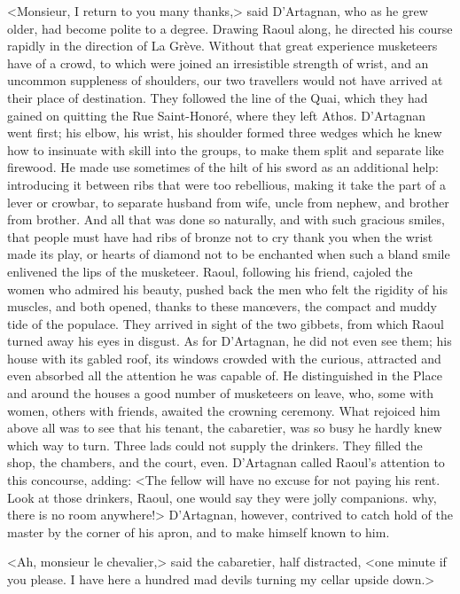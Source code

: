 <Monsieur, I return to you many thanks,> said D'Artagnan, who as he grew older, had become polite to a degree. Drawing Raoul along, he directed his course rapidly in the direction of La Grève. Without that great experience musketeers have of a crowd, to which were joined an irresistible strength of wrist, and an uncommon suppleness of shoulders, our two travellers would not have arrived at their place of destination. They followed the line of the Quai, which they had gained on quitting the Rue Saint-Honoré, where they left Athos. D'Artagnan went first; his elbow, his wrist, his shoulder formed three wedges which he knew how to insinuate with skill into the groups, to make them split and separate like firewood. He made use sometimes of the hilt of his sword as an additional help: introducing it between ribs that were too rebellious, making it take the part of a lever or crowbar, to separate husband from wife, uncle from nephew, and brother from brother. And all that was done so naturally, and with such gracious smiles, that people must have had ribs of bronze not to cry thank you when the wrist made its play, or hearts of diamond not to be enchanted when such a bland smile enlivened the lips of the musketeer. Raoul, following his friend, cajoled the women who admired his beauty, pushed back the men who felt the rigidity of his muscles, and both opened, thanks to these manœvers, the compact and muddy tide of the populace. They arrived in sight of the two gibbets, from which Raoul turned away his eyes in disgust. As for D'Artagnan, he did not even see them; his house with its gabled roof, its windows crowded with the curious, attracted and even absorbed all the attention he was capable of. He distinguished in the Place and around the houses a good number of musketeers on leave, who, some with women, others with friends, awaited the crowning ceremony. What rejoiced him above all was to see that his tenant, the cabaretier, was so busy he hardly knew which way to turn. Three lads could not supply the drinkers. They filled the shop, the chambers, and the court, even. D'Artagnan called Raoul's attention to this concourse, adding: <The fellow will have no excuse for not paying his rent. Look at those drinkers, Raoul, one would say they were jolly companions.  why, there is no room anywhere!> D'Artagnan, however, contrived to catch hold of the master by the corner of his apron, and to make himself known to him.

<Ah, monsieur le chevalier,> said the cabaretier, half distracted, <one minute if you please. I have here a hundred mad devils turning my cellar upside down.>


